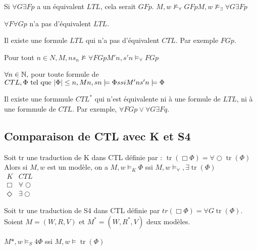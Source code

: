 \documentclass[10pt,a4paper]{article}
\newcommand{\ssi}{$ ssi $}
\DeclareMathOperator{\Oo}{\bigcirc}
\DeclareMathOperator{\Tr}{tr}
\begin{document}
\begin{dem}
 Si $\forall G \exists F p$ a un équivalent $LTL$, cela serait $G F p$.
$M, w \not \models_\forall G F p
M, w \not \models_\exists \forall G \exists F p$
\end{dem}

\begin{ex}
 $\forall F \forall G p$ n'a pas d'équivalent $LTL$.
\end{ex}

\begin{thm}
 Il existe une formule $LTL$ qui n'a pas d'équivalent $CTL$.
Par exemple $FGp$.
\end{thm}

Pour tout $n \in N,
M, n s_n \not \models \forall FGp
M'n, s'n \models_\forall F G p$

\begin{lem}
 $\forall n \in \mathbb{N},$ pour toute formule de $CTL, \Phi \text{ tel que } | \Phi | \leq n, Mn, sn \models \Phi ssi M'n s'n \models \Phi$
\end{lem}

\begin{thm}
 Il existe une formmule $CTL^*$ qui n'est équivalente ni à une formule de $LTL$, ni à une formmule de $CTL$.
Par exemple, $\forall F G p \vee \forall G \exists F q$.
\end{thm}

\subsection{Comparaison de CTL avec K et S4}

\begin{prop}
 Soit tr une traduction de K dans CTL définie par :
$\Tr(\Box \Phi) = \forall \Oo \Tr(\Phi)$\\
Alors si $M, w$ est un modèle, on a 
$M,w \models_K \Phi \ssi M,w \models_\forall,\exists \Tr(\Phi)$\\

$\begin{array}{cc}
 K & CTL\\
 \Box & \forall \Oo
 \\ \Diamond & \exists \Oo
\end{array}$
\end{prop}

\begin{prop}
  Soit tr une traduction de S4 dans CTL définie par
$tr(\Box \Phi ) = \forall G \Tr(\Phi)$.\\
Soient $M = (W, R ,V)$ et $M^* = (W, R^*, V)$ deux modèles.

$M* , w \models_S4 \Phi$ ssi $M,w \models \Tr(\Phi)$
\end{prop}
\end{document}
